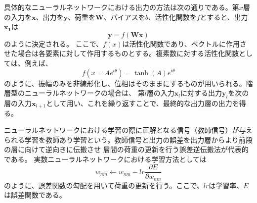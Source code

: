 \documentclass[11pt,a4paper,uplatex]{ujarticle}
\begin{document}
    具体的なニューラルネットワークにおける出力の方法は次の通りである。第$x$層の入力を$\bm{x}$、出力を$\bm{y}$、荷重を$\bm{W}$、バイアスを$b$、活性化関数を$f$とすると、出力$\bm{x_1}$は
    \begin{equation}
      \bm{y} = f(\bm{W}\bm{x})
    \end{equation}
    のように決定される。
    ここで、$f(x)$は活性化関数であり、ベクトルに作用させた場合は各要素に対して作用するものとする。複素数に対する活性化関数としては、例えば、
    \begin{equation}\label{activation_function}
      f(x = Ae^{i\theta}) = \tanh(A)e^{i\theta}
    \end{equation}
    のように、振幅のみを非線形化し、位相はそのままにするものが用いられる。階層型のニューラルネットワークの場合は、
    第$l$層の入力$\bm{x}_l$に対する出力$\bm{y}_l$を次の層の入力$\bm{x}_{l+1}$として用い、これを繰り返すことで、最終的な出力層の出力を得る。

    ニューラルネットワークにおける学習の際に正解となる信号（教師信号）が与えられる学習を教師あり学習という。教師信号と出力の誤差を出力層からより前段の層に向けて逆向きに伝搬させ
    層間の荷重の更新を行う誤差逆伝搬法が代表的である。
    実数ニューラルネットワークにおける学習方法としては
    \begin{equation}
      w_{nm} \leftarrow w_{nm} - lr \frac{\partial E}{\partial w_{nm}}
    \end{equation}
    のように、誤差関数の勾配を用いて荷重の更新を行う。ここで、$lr$は学習率、$E$は誤差関数である。
\end{document}
